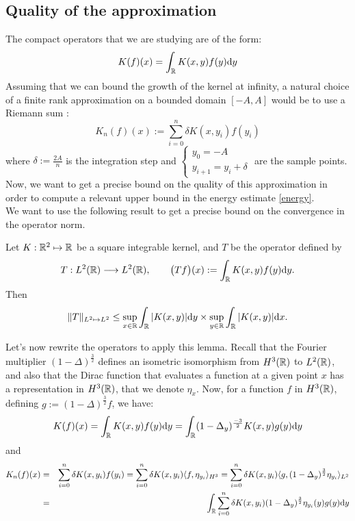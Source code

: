 \documentclass[11pt,a4paper]{article}
\begin{document}
\subsection{ Quality of the approximation}
The compact operators that we are studying are of the form: \[K(f)(x) = \int_\mathbb R K(x,y)f(y)\mathrm{d}y \]
Assuming that we can bound the growth of the kernel at infinity, a natural choice of a finite rank approximation on a bounded domain $[-A,A]$ would be to use a Riemann sum : \[K_n(f)(x) := \sum_{i=0}^n \delta K(x,y_i)f(y_i)\]
where $\delta := \frac{2A}{n}$ is the integration step and $\begin{cases} y_0=-A \\ y_{i+1}=y_i + \delta \end{cases}$ are the sample points. \\

Now, we want to get a precise bound on the quality of this approximation in order to compute a relevant upper bound in the energy estimate \ref{energy}. \\
We want to use the following result to get a precise bound on the convergence in the operator norm.
\begin{lemma}\label{schur}
Let $K: \mathbb R^2 \mapsto \mathbb R$ be a square integrable kernel, and $T$ be the operator defined by 
\[ T: L^2(\mathbb R) \longrightarrow L^2(\mathbb R), \qquad \big(Tf\big)(x) := \int_{\mathbb R}K(x,y) f(y)\mathrm{d}y. \] 
Then \[\displaystyle \|T\|_{L^2\mapsto L^2} \leq \sup_{x\in \mathbb R} \int_\mathbb R |K(x,y)|\mathrm{d}y\times  \sup_{y\in \mathbb R} \int_\mathbb R |K(x,y)|\mathrm{d}x.\] 
\end{lemma}

Let's now rewrite the operators to apply this lemma. Recall that the Fourier multiplier $(1-\Delta)^\frac{3}{2}$ defines an isometric isomorphism from $H^3(\mathbb R)$ to $L^2(\mathbb R)$, and also that the Dirac function that evaluates a function at a given point $x$ has a representation in $H^3(\mathbb R)$, that we denote $\eta_x$. Now, for a function $f$ in $H^3(\mathbb R)$, defining $g:=(1-\Delta)^\frac{3}{2}f$, we have: 
\[K(f)(x) = \int_\mathbb R K(x,y)f(y)\mathrm{d}y = \int_\mathbb R(1-\Delta_y)^\frac{-3}{2} K(x,y)g(y)\mathrm{d}y\]
and 
\begin{eqnarray*}
K_n(f)(x) &=& \sum_{i=0}^n \delta K(x,y_i)f(y_i) = \sum_{i=0}^n \delta K(x,y_i)\langle f, \eta_{y_i} \rangle_{H^3} =   \sum_{i=0}^n \delta K(x,y_i)\langle g, (1-\Delta_y)^\frac{3}{2}\eta_{y_i} \rangle_{L^2} \\
&=&\int_\mathbb R \sum_{i=0}^n \delta K(x,y_i)(1-\Delta_y)^\frac{3}{2}\eta_{y_i}(y)g(y)\mathrm{d}y 
\end{eqnarray*} 
\end{document}

